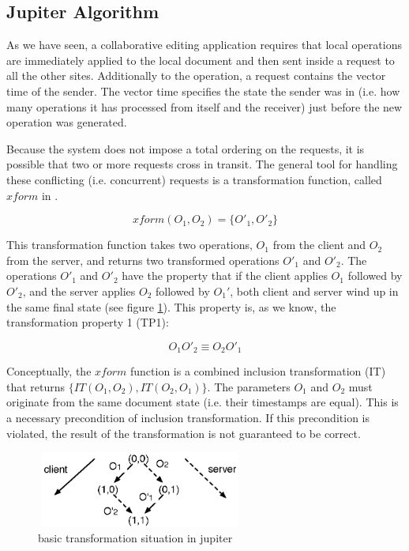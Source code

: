 \subsection{Jupiter Algorithm}
As we have seen,
a collaborative editing application requires that local operations are immediately applied to the local document and then sent inside a request to all
the other sites. Additionally to the operation, a request contains the vector
time of the sender. The vector time specifies the state the sender was in
(i.e. how many operations it has processed from itself and the receiver) just
before the new operation was generated.

Because the system does not impose a total ordering on the requests, it is
possible that two or more requests cross in transit. The general tool for 
handling these conflicting (i.e. concurrent) requests is a transformation function, called $xform$ in \cite{jupiter95}.

$$ xform(O_1,O_2)=\{O'_1,O'_2\} $$

This transformation function takes two operations, $O_1$ from the client and 
$O_2$ from the server, and returns two transformed operations $O'_1$ and $O'_2$.
The operations $O'_1$ and $O'_2$ have the property that if the client applies 
$O_1$ followed by $O'_2$, and the server applies $O_2$ followed by $O_1'$, both 
client and server wind up in the same final state (see figure 
\ref{fig:algorithm.basic}). This property is, as we know, the transformation property 1 (TP1):

$$ O_1 O'_2 \equiv O_2 O'_1 $$

Conceptually, the $xform$ function is a combined inclusion transformation (IT) 
that returns $\{IT(O_1,O_2),IT(O_2,O_1)\}$. The parameters $O_1$ and $O_2$ must 
originate from the same document state
(i.e. their timestamps are equal). This is a necessary precondition of 
inclusion transformation. If this precondition is violated, the result of the 
transformation is not guaranteed to be correct.

\begin{figure}[htb]
 \centering
 \includegraphics[width=6.85cm,height=2.5cm]{../images/finalreport/algorithm_jupiter1.eps}
 \caption{basic transformation situation in jupiter}
 \label{fig:algorithm.basic}
\end{figure}

